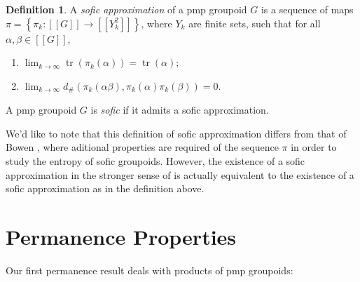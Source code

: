 \documentclass[11pt]{amsart}
\theoremstyle{plain}    \newtheorem{theorem}[generalnumbering]{Theorem}
\theoremstyle{plain}    \newtheorem{corollary}[generalnumbering]{Corollary}
\theoremstyle{definition}   \newtheorem{definition}[generalnumbering]{Definition}
\theoremstyle{definition}   \newtheorem{example}[generalnumbering]{Example}
\theoremstyle{plain}    \newtheorem{proposition}[generalnumbering]{Proposition}
\theoremstyle{plain}    \newtheorem{lemma}[generalnumbering]{Lemma}
\theoremstyle{plain}    \newtheorem{plainstyle}[generalnumbering]{\namefordifferentenvironment}
\theoremstyle{plain}    \newtheorem*{plainstyle*}{\namefordifferentenvironment}
\theoremstyle{definition}    \newtheorem{definitionstyle}[generalnumbering]{\namefordifferentenvironment}
\theoremstyle{definition}    \newtheorem*{definitionstyle*}{\namefordifferentenvironment}
\begin{document}
\begin{definition}\label{definitionsoficapproximation}
A \emph{sofic approximation} of a pmp groupoid $G$ is a sequence of maps $\pi=\left\{\pi_k:[[G]]\to[[Y_k^2]]\right\}$, where $Y_k$ are finite sets, such that for all $\alpha,\beta\in[[G]]$,
\begin{enumerate}[label=(\roman*)]
\item $\lim_{k\to\infty}\operatorname{tr}(\pi_k(\alpha))=\operatorname{tr}(\alpha)$;
\item $\lim_{k\to\infty}d_\#(\pi_k(\alpha\beta),\pi_k(\alpha)\pi_k(\beta))=0$.
\end{enumerate}
A pmp groupoid $G$ is \emph{sofic} if it admits a sofic approximation.
\end{definition}

We'd like to note that this definition of sofic approximation differs from that of Bowen \cite{MR3286052}, where aditional properties are required of the sequence $\pi$ in order to study the entropy of sofic groupoids. However, the existence of a sofic approximation in the stronger sense of \cite{MR3286052} is actually equivalent to the existence of a sofic approximation as in the definition above.

\section{Permanence Properties}

Our first permanence result deals with products of pmp groupoids:
\end{document}
